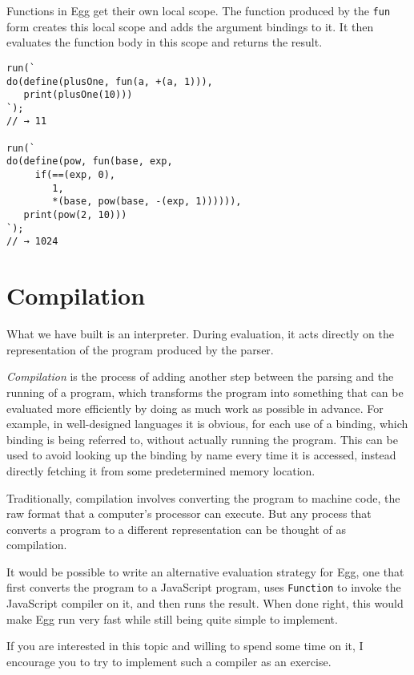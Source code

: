 Functions in Egg get their own local scope. The function produced by the \lstinline`fun` form creates this local scope and adds the argument bindings to it. It then evaluates the function body in this scope and returns the result.

\begin{lstlisting}
run(`
do(define(plusOne, fun(a, +(a, 1))),
   print(plusOne(10)))
`);
// → 11

run(`
do(define(pow, fun(base, exp,
     if(==(exp, 0),
        1,
        *(base, pow(base, -(exp, 1)))))),
   print(pow(2, 10)))
`);
// → 1024
\end{lstlisting}
\noindent

\section{Compilation}

What we have built is an interpreter. During evaluation, it acts directly on the representation of the program produced by the parser.

\emph{Compilation} is the process of adding another step between the parsing and the running of a program, which transforms the program into something that can be evaluated more efficiently by doing as much work as possible in advance. For example, in well-designed languages it is obvious, for each use of a binding, which binding is being referred to, without actually running the program. This can be used to avoid looking up the binding by name every time it is accessed, instead directly fetching it from some predetermined memory location.

Traditionally, compilation involves converting the program to machine code, the raw format that a computer's processor can execute. But any process that converts a program to a different representation can be thought of as compilation.

It would be possible to write an alternative evaluation strategy for Egg, one that first converts the program to a JavaScript program, uses \lstinline`Function` to invoke the JavaScript compiler on it, and then runs the result. When done right, this would make Egg run very fast while still being quite simple to implement.

If you are interested in this topic and willing to spend some time on it, I encourage you to try to implement such a compiler as an exercise.

